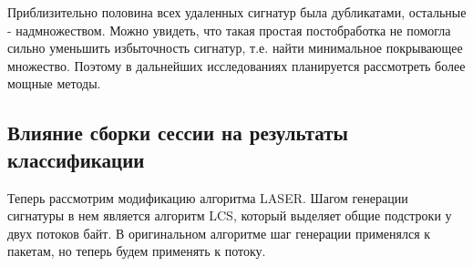 \begin{table}[tH]
    \caption{Количество сигнатур после постобработки.}
    \label{post-processing}
    \centering
\end{table}

Приблизительно половина всех удаленных сигнатур была дубликатами, остальные - надмножеством.
Можно увидеть, что такая простая постобработка не помогла сильно уменьшить избыточность сигнатур, т.е. найти минимальное покрывающее множество.
Поэтому в дальнейших исследованиях планируется рассмотреть более мощные методы.

\subsection{Влияние сборки сессии на результаты классификации}

Теперь рассмотрим модификацию алгоритма LASER. Шагом генерации сигнатуры в нем является алгоритм LCS, который выделяет общие подстроки у двух потоков байт.
В оригинальном алгоритме шаг генерации применялся к пакетам, но теперь будем применять к потоку.

